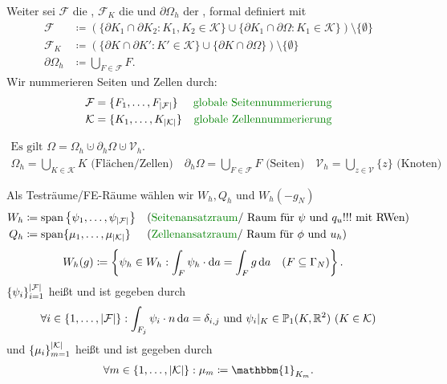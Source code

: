 Weiter sei $ \mathcal{F} $ die , $ \mathcal{F}_K $ die  und $ \partial \Omega_h $ der , formal definiert mit
\begin{align*}
	\mathcal{F} &\coloneqq \left( \{ \partial K_1 \cap \partial K_2 : K_1,K_2 \in \mathcal{K} \} \cup \{ \partial K_1 \cap \partial \Omega : K_1 \in \mathcal{K}\} \right) \setminus \{ \emptyset \} \\
	\mathcal{F}_K &\coloneqq \left( \{ \partial K \cap \partial K' : K' \in \mathcal{K} \} \cup \{ \partial K \cap \partial \Omega\} \right) \setminus \{ \emptyset \} \\
	\partial \Omega_h &\coloneqq \bigcup_{F \in \mathcal{F}} F.
\end{align*}
Wir nummerieren Seiten und Zellen durch:
\begin{align*}
	\mathcal{F} &= \{F_1, \dots , F_{\abs{\mathcal{F}}} \} &\text{\defi{globale Seitennummerierung}} \\
	\mathcal{K} &= \{K_1, \dots , K_{\abs{\mathcal{K}}} \} &\text{\defi{globale Zellennummerierung}} 
\end{align*}
\begin{remark}
	\begin{gather*}
	\text{Es gilt }\Omega = \Omega_h \cupdot \partial_h\Omega \cupdot \mathcal{V}_h. \\
	\Omega_h = \bigcup_{K \in \mathcal{K}} K \text{ (Flächen/Zellen)}\quad \partial_h\Omega = \bigcup_{F \in \mathcal{F}} F \text{ (Seiten)}\quad \mathcal{V}_h = \bigcup_{z \in \mathcal{V}}\{ z \} \text{ (Knoten)}	
	\end{gather*}
\end{remark}
\begin{define}
	Als Testräume/FE-Räume wählen wir $ W_h, Q_h $ und $ W_h(-g_N) $
	\begin{align*}
		W_h &\coloneqq \spann \left\{ \psi_1, \dots , \psi_{\abs{\mathcal{F}}}  \right\} &&\text{(\defi{Seitenansatzraum}/ Raum für $ \psi $ und $ q_u!!! $ mit RWen)}\\
		Q_h &\coloneqq \spann \{ \mu_1, \dots , \mu_{\abs{\mathcal{K}}} \} &&\text{(\defi{Zellenansatzraum}/ Raum für $ \phi $ und $ u_h $)}
	\end{align*}
	\begin{align*}
		W_h(g) &\coloneqq \left\{ \psi_h \in W_h: \int_F \psi_h \cdot \mathop{}\!\mathrm{d} a = \int_F g \mathop{}\!\mathrm{d} a \quad (F \subseteq \Gamma_N) \right\}.
	\end{align*}
	$ \{ \psi_i \}_{i=1}^{\abs{\mathcal{F}}} $ heißt  und ist gegeben durch 
	\begin{align*}
		\forall i \in \{1, \dots , \abs{\mathcal{F}} \} : \int_{F_j} \psi_i \cdot n \mathop{}\!\mathrm{d} a = \delta_{i,j} \text{ und }  \psi_i|_K \in \mathbb{P}_1(K,\mathbb{R}^2) \ (K \in \mathcal{K}) 
	\end{align*}
	und  $ \{ \mu_i \}_{m=1}^{\abs{\mathcal{K}}} $ heißt  und ist gegeben durch
	\begin{align*}
		\forall m \in \{1, \dots , \abs{\mathcal{K}} \} : \mu_m \coloneqq  \mathbbm{1}_{K_m}.
	\end{align*}
\end{define}


